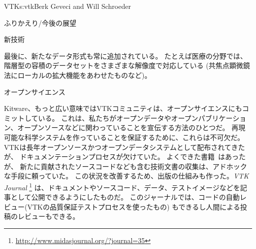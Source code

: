 \begin{aosachapter}{VTK}{s:vtk}{Berk Geveci and Will Schroeder}
\begin{aosasect1}{ふりかえり/今後の展望}
\begin{aosasect2}{新技術}
\begin{aosaitemize}
  \item 最後に、新たなデータ形式も常に追加されている。
  たとえば医療の分野では、階層型の容積のデータセットをさまざまな解像度で対応している
  (共焦点顕微鏡法にローカルの拡大機能をあわせたものなど)。

\end{aosaitemize}

\end{aosasect2}

\begin{aosasect2}{オープンサイエンス}

Kitware、もっと広い意味ではVTKコミュニティは、オープンサイエンスにもコミットしている。
これは、私たちがオープンデータやオープンパブリケーション、オープンソースなどに関わっていることを宣伝する方法のひとつだ。
再現可能な科学システムを作っていることを保証するために、これらは不可欠だ。
VTKは長年オープンソースかつオープンデータシステムとして配布されてきたが、
ドキュメンテーションプロセスが欠けていた。
よくできた書籍~\cite{bib:vtk:userguide,bib:vtk:toolkit}はあったが、
新たに貢献されたソースコードなども含む技術文書の収集は、アドホックな手段に頼っていた。
この状況を改善するため、出版の仕組みも作った。\emph{VTK Journal}
\footnote{\url{http://www.midasjournal.org/?journal=35}}
は、ドキュメントやソースコード、データ、テストイメージなどを記事として公開できるようにしたものだ。
このジャーナルでは、コードの自動レビュー(VTKの品質保証テストプロセスを使ったもの)
もできるし人間による投稿のレビューもできる。


\end{aosasect2}
\end{aosasect1}
\end{aosachapter}
